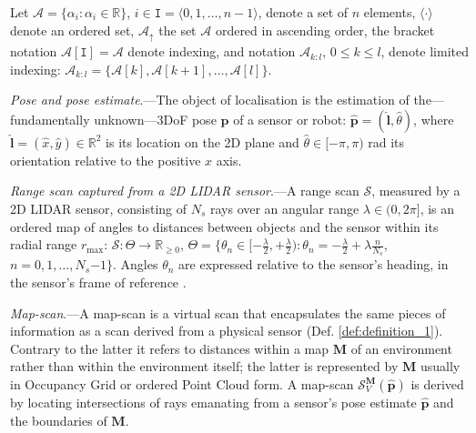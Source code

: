 Let $\mathcal{A} = \{\alpha_i: \alpha_i \in \mathbb{R}\}$,
$i \in \texttt{I} = \langle 0,1,\dots,n-1 \rangle$, denote a set of $n$ elements,
$\langle\cdot\rangle$ denote an ordered set, $\mathcal{A}_{\uparrow}$ the
set $\mathcal{A}$ ordered in ascending order, the bracket notation
$\mathcal{A}[\texttt{I}] = \mathcal{A}$ denote indexing, and notation
$\mathcal{A}_{k:l}$, $0 \leq k \leq l$, denote limited indexing:
$\mathcal{A}_{k:l}= \{\mathcal{A}[k], \mathcal{A}[k+1], \dots, \mathcal{A}[l]\}$.

\begin{definition}
  \label{def:definition_0} \textit{Pose and pose estimate}.---The object of
  localisation is the estimation of the---fundamentally unknown---3DoF pose
  $\bm{p}$ of a sensor or robot: $\hat{\bm{p}} = (\hat{\bm{l}}, \hat{\theta})$,
  where $\hat{\bm{l}} = (\hat{x},\hat{y}) \in \mathbb{R}^2$ is its location on
  the 2D plane and $\hat{\theta} \in [-\pi, \pi)$ rad its orientation relative
  to the positive $x$ axis.
\end{definition}

\begin{definition}
  \label{def:definition_1} \textit{Range scan captured from a 2D LIDAR
  sensor}.---A range scan $\mathcal{S}$, measured by a 2D LIDAR sensor,
  consisting of $N_s$ rays over an angular range $\lambda \in (0,2\pi]$, is an
  ordered map of angles to distances between objects and the sensor within its
  radial range $r_{\max}$: $\mathcal{S} : \Theta \rightarrow \mathbb{R}_{\geq
  0}$, $\Theta = \{\theta_n \in [-\frac{\lambda}{2}, +\frac{\lambda}{2}) :
  \theta_n = -\frac{\lambda}{2} + \lambda \frac{n}{N_s}$, $n = 0,1,\dots,
  N_s$$-$$1$$\}$.  Angles $\theta_n$ are expressed relative to the sensor's
  heading, in the sensor's frame of reference \cite{Cooper2018c}.
\end{definition}

\begin{definition}
  \label{def:definition_2} \textit{Map-scan}.---A map-scan is a virtual scan
  that encapsulates the same pieces of information as a scan derived from a
  physical sensor (Def. \ref{def:definition_1}). Contrary to the latter it
  refers to distances within a map $\bm{M}$ of an environment rather than within
  the environment itself; the latter is represented by $\bm{M}$ usually in
  Occupancy Grid or ordered Point Cloud form. A map-scan
  $\mathcal{S}_V^{\bm{M}}(\hat{\bm{p}})$ is derived by locating intersections
  of rays emanating from a sensor's pose estimate $\hat{\bm{p}}$ and the
  boundaries of $\bm{M}$.
\end{definition}

